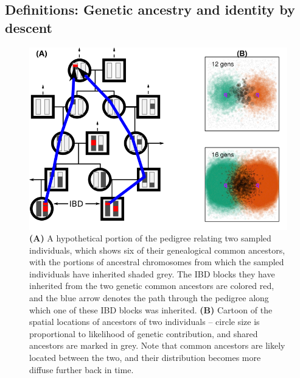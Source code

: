 \documentclass{article}
\begin{document}
\subsection{Definitions: Genetic ancestry and identity by descent}
\label{ss:finding_ibd}

\begin{figure}[!htp]
  \begin{center}
    \includegraphics{conceptual-fig-combined}
    \caption{
      {\bf (A)} A hypothetical portion of the pedigree relating two sampled individuals, which shows six of their genealogical common ancestors,
      with the portions of ancestral chromosomes from which the sampled individuals have inherited shaded grey.
      The IBD blocks they have inherited from the two genetic common ancestors are colored red,
      and the blue arrow denotes the path through the pedigree along which one of these IBD blocks was inherited.
      {\bf (B)} Cartoon of the spatial locations of ancestors of two individuals --
      circle size is proportional to likelihood of genetic contribution,
      and shared ancestors are marked in grey.
      Note that common ancestors are likely located between the two,
      and their distribution becomes more diffuse further back in time.
    \label{fig:conceptual}
    }
  \end{center}
\end{figure}
\end{document}
